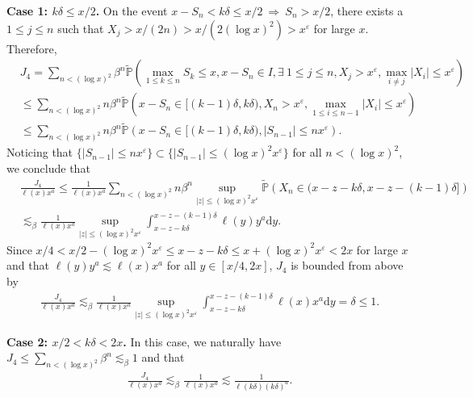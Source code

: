 \documentclass[11pt]{article}
\numberwithin{equation}{section}
\begin{document}
\noindent
{\bf Case 1: $k\delta \leq x/2$.}
 On the event $x-S_n <k\delta \leq x/2\ \Rightarrow\ S_n>x/2$, there exists a $1\leq j\leq n$ such that $X_j >x/(2n)> x/(2(\log x)^2)> x^\varepsilon$ for large $x$. Therefore, 
\begin{align}
	& J_4 = \sum_{n<(\log x)^2} \beta^{n}\widetilde{\mathbb{P}}\left(\max_{1\leq k \leq n} S_k \leq x, x-S_n\in I, \exists \  1\leq j\leq n, X_j>x^\varepsilon,  \max_{i\neq  j} |X_i|\leq x^{\varepsilon}\right) \nonumber\\
	& \leq \sum_{n<(\log x)^2} n\beta^{n}\widetilde{\mathbb{P}}\left( x-S_n\in [(k-1)\delta, k\delta), X_n>x^\varepsilon,  \max_{1\leq i\leq n-1} |X_i|\leq x^{\varepsilon}\right) \nonumber\\
	& \leq \sum_{n<(\log x)^2} n\beta^{n}\widetilde{\mathbb{P}}\left( x-S_n\in [(k-1)\delta, k\delta),    |S_{n-1}|\leq nx^{\varepsilon}\right) .
\end{align}
Noticing that $\{|S_{n-1}|\leq nx^{\varepsilon}\}\subset \{|S_{n-1}|\leq (\log x)^2 x^\varepsilon\}$ for all $n< (\log x)^2$, we conclude that 
\begin{align}
	& \frac{J_4}{\ell(x) x^a }   \leq \frac{1}{\ell(x)x^a}\sum_{n<(\log x)^2} n\beta^{n} \sup_{|z|\leq (\log x)^2 x^\varepsilon} \widetilde{\mathbb{P}}\left( X_n \in (x-z- k\delta, x-z-(k-1)\delta]  \right) \nonumber\\
	&\lesssim_\beta \frac{1}{\ell(x)x^a}  \sup_{|z|\leq (\log x)^2 x^\varepsilon} \int_{x-z-k\delta}^{x-z-(k-1)\delta} \ell(y)y^a \mathrm{d} y.
\end{align}
Since $x/4< x/2 -  (\log x)^2 x^\varepsilon  \leq x-z-k\delta \leq x+ (\log x)^2 x^\varepsilon<2x $ for large $x$ and that $\ell(y)y^a\lesssim \ell(x)x^a$ for all $y\in [x/4, 2x]$,  $J_4$ is bounded from above by
\begin{align}\label{e25-1}
	\frac{J_4}{\ell(x) x^a } \lesssim_\beta \frac{1}{\ell(x)x^a}  \sup_{|z|\leq (\log x)^2 x^\varepsilon} \int_{x-z-k\delta}^{x-z-(k-1)\delta} \ell(x)x^a \mathrm{d} y=\delta\leq  1. 
\end{align}

\noindent
{\bf Case 2: $x/2< k\delta <2 x $.}  In this case,  we naturally have $J_4\leq \sum_{n<(\log x)^2} \beta^{n}\lesssim_\beta 1$ and that 
\begin{align}\label{e25-2}
	\frac{J_4}{\ell(x) x^a } \lesssim_\beta \frac{1}{\ell(x) x^a }\lesssim \frac{1}{\ell(k\delta) (k\delta)^a}.
\end{align}
\end{document}
